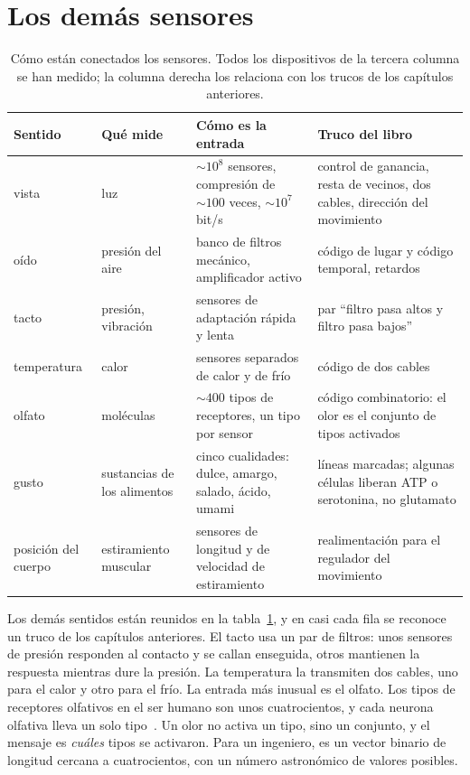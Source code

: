 \section{Los demás sensores}

\begin{table}[t]
\centering
\footnotesize
\setlength{\tabcolsep}{3pt}
\renewcommand{\arraystretch}{1.15}
\begin{tabular}{>{\raggedright}p{1.9cm}>{\raggedright}p{2.6cm}>{\raggedright}p{4.0cm}>{\raggedright\arraybackslash}p{4.6cm}}
\toprule
Sentido & Qué mide & Cómo es la entrada & Truco del libro \\
\midrule
vista & luz & $\sim10^8$ sensores, compresión de $\sim100$ veces, $\sim10^7$ bit/s & control de ganancia, resta de vecinos, dos cables, dirección del movimiento \\
oído & presión del aire & banco de filtros mecánico, amplificador activo & código de lugar y código temporal, retardos \\
tacto & presión, vibración & sensores de adaptación rápida y lenta & par “filtro pasa altos y filtro pasa bajos” \\
temperatura & calor & sensores separados de calor y de frío & código de dos cables \\
olfato & moléculas & $\sim400$ tipos de receptores, un tipo por sensor & código combinatorio: el olor es el conjunto de tipos activados \\
gusto & sustancias de los alimentos & cinco cualidades: dulce, amargo, salado, ácido, umami & líneas marcadas; algunas células liberan ATP o serotonina, no glutamato \\
posición del cuerpo & estiramiento muscular & sensores de longitud y de velocidad de estiramiento & realimentación para el regulador del movimiento \\
\bottomrule
\end{tabular}
\caption{Cómo están conectados los sensores. Todos los dispositivos de la tercera columna se han medido; la columna derecha los relaciona con los trucos de los capítulos anteriores.}
\label{tab:sensors}
\end{table}

Los demás sentidos están reunidos en la tabla~\ref{tab:sensors}, y en casi cada fila se reconoce un truco de los capítulos anteriores. El tacto usa un par de filtros: unos sensores de presión responden al contacto y se callan enseguida, otros mantienen la respuesta mientras dure la presión. La temperatura la transmiten dos cables, uno para el calor y otro para el frío. La entrada más inusual es el olfato. Los tipos de receptores olfativos en el ser humano son unos cuatrocientos, y cada neurona olfativa lleva un solo tipo~\cite{Mombaerts2004}. Un olor no activa un tipo, sino un conjunto, y el mensaje es \emph{cuáles} tipos se activaron. Para un ingeniero, es un vector binario de longitud cercana a cuatrocientos, con un número astronómico de valores posibles.

